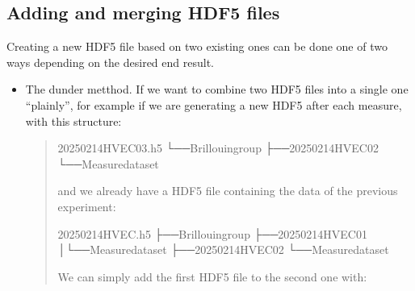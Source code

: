 \documentclass[letterpaper,10pt,english]{sphinxmanual}
\begin{document}
\subsection{Adding and merging HDF5 files}
\label{\detokenize{source/hdf5_bls_package:adding-and-merging-hdf5-files}}
\sphinxAtStartPar
Creating a new HDF5 file based on two existing ones can be done one of two ways depending on the desired end result.
\begin{itemize}
\item {} 
\sphinxAtStartPar
The  dunder metthod. If we want to combine two HDF5 files into a single one “plainly”, for example if we are generating a new HDF5 after each measure, with this structure:
\begin{quote}

\begin{sphinxVerbatim}[commandchars=\\\{\}]
20250214\PYGZus{}HVEC\PYGZus{}03.h5
└──Brillouingroup
├──20250214\PYGZus{}HVEC\PYGZus{}02
└──Measuredataset
\end{sphinxVerbatim}

\sphinxAtStartPar
and we already have a HDF5 file containing the data of the previous experiment:

\begin{sphinxVerbatim}[commandchars=\\\{\}]
20250214\PYGZus{}HVEC.h5
├──Brillouingroup
├──20250214\PYGZus{}HVEC\PYGZus{}01
│└──Measuredataset
├──20250214\PYGZus{}HVEC\PYGZus{}02
└──Measuredataset
\end{sphinxVerbatim}

\sphinxAtStartPar
We can simply add the first HDF5 file to the second one with:

\begin{sphinxVerbatim}[commandchars=\\\{\}]
    
    
    
\end{sphinxVerbatim}


\end{quote}
\end{itemize}
\end{document}
